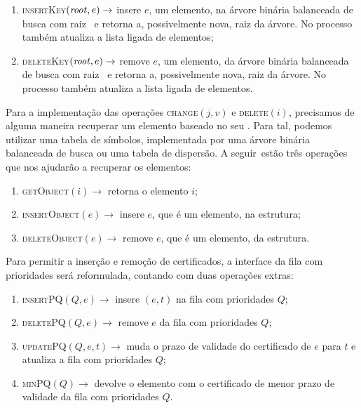 \begin{enumerate}
    \item \textsc{insertKey}$(\text{\textit{root}},e)\rightarrow$ insere
    $e$, um elemento, na árvore binária balanceada de busca com raiz
    \raiz~e retorna a, possivelmente nova, raiz da árvore. No
    processo também atualiza a lista ligada de elementos;

    \item \textsc{deleteKey}$(\text{\textit{root}},e)\rightarrow$ remove
    $e$, um elemento, da árvore binária balanceada de busca com raiz
    \raiz~e retorna a, possivelmente nova, raiz da árvore. No
    processo também atualiza a lista ligada de elementos.

\end{enumerate}
Para a implementação das operações \textsc{change}$(j, v)$ e
\textsc{delete}$(i)$, precisamos de alguma maneira recuperar um
elemento baseado no seu \id. Para tal, podemos utilizar uma tabela
de símbolos, implementada por uma árvore binária balanceada de busca
ou uma tabela de dispersão. A seguir~estão três operações que nos
ajudarão a recuperar os elementos:

\begin{enumerate}
    \item \textsc{getObject}$(i)\rightarrow$ retorna o elemento $i$;
    \item \textsc{insertObject}$(e) \rightarrow$ insere $e$,
    que é um elemento, na estrutura;
    \item \textsc{deleteObject}$(e) \rightarrow$ remove $e$,
    que é um elemento, da estrutura.
\end{enumerate}

Para permitir a inserção e remoção de certificados, a interface da
fila com prioridades será reformulada, contando com duas operações
extras:

\begin{enumerate}
    \item \textsc{insertPQ}$(Q, e) \rightarrow$ insere $(e, t)$
    na fila com prioridades $Q$;
    \item \textsc{deletePQ}$(Q, e) \rightarrow$ remove $e$
    da fila com prioridades $Q$;
    \item \textsc{updatePQ}$(Q,e,t) \rightarrow$ muda o prazo de
    validade do certificado de $e$ para $t$ e atualiza a fila com
    prioridades $Q$;
    \item \textsc{minPQ}$(Q) \rightarrow$ devolve o elemento com o
    certificado de menor prazo de validade da fila com prioridades
    $Q$.
\end{enumerate}

